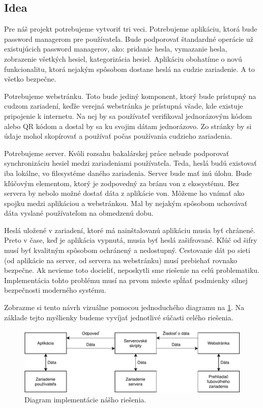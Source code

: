 \subsection{Idea}
Pre náš projekt potrebujeme vytvoriť tri veci. Potrebujeme aplikáciu, ktorá bude password managerom pre používateľa. Bude podporovať štandardné operácie už existujúcich password managerov, ako: pridanie hesla, vymazanie hesla, zobrazenie všetkých hesiel, kategorizácia hesiel. Aplikáciu obohatíme o novú funkcionalitu, ktorá nejakým spôsobom dostane heslá na cudzie zariadenie. A to všetko bezpečne.

Potrebujeme webstránku. Toto bude jediný komponent, ktorý bude prístupný na cudzom zariadení, keďže verejná webstránka je prístupná všade, kde existuje pripojenie k internetu. Na nej by sa používateľ verifikoval jednorázovým kódom alebo QR kódom a dostal by sa ku svojim dátam jednorázovo. Zo stránky by si údaje mohol skopírovať a používať počas používania cudzieho zariadenia.

Potrebujeme server. Kvôli rozsahu bakalárskej práce nebude podporovať synchronizáciu hesiel medzi zariadeniami používateľa. Teda, heslá budú existovať iba lokálne, vo filesystéme daného zariadenia. Server bude mať inú úlohu. Bude kľúčovým elementom, ktorý je zodpovedný za bránu von z ekosystému. Bez servera by nebolo možné dostať dáta z aplikácie von. Môžeme ho vnímať ako spojku medzi aplikáciou a webstránkou. Mal by nejakým spôsobom uchovávať dáta vyslané používateľom na obmedzenú dobu. 

Heslá uložené v zariadení, ktoré má nainštalovanú aplikáciu musia byť chránené. Preto v čase, keď je aplikácia vypnutá, musia byť heslá zašifrované. Kľúč od šifry musí byť kvalitným spôsobom ochránený a nedostupný. Cestovanie dát po sieti (od aplikácie na server, od servera na webstránku) musí prebiehať rovnako bezpečne. Ak nevieme toto docieliť, neposkytli sme riešenie na celú problematiku. Implementácia tohto problému musí na prvom mieste spĺňať podmienky silnej bezpečnosti moderného systému.

Zobrazme si tento návrh vizuálne pomocou jednoduchého diagramu na \figurename{ \ref{idea}}. Na základe tejto myšlienky budeme vyvíjať jednotlivé súčasti celého riešenia.

\begin{figure}[H]
  \centering
  \includegraphics[width=15cm]{img/idea.pdf}
  \caption{Diagram implementácie nášho riešenia.}
  \label{idea}
\end{figure}

